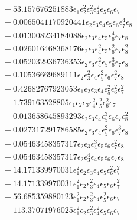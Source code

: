 \documentclass[10pt]{article}
\begin{document}
\begin{align*}
&{}  + 53.157676251883 \epsilon_{1} \epsilon_{2}^{2} \epsilon_{3}^{2} \epsilon_{4}^{2} \epsilon_{5} \epsilon_{6} \epsilon_{7} \\
&{}  + 0.0065041170920441 \epsilon_{2} \epsilon_{3} \epsilon_{4} \epsilon_{5} \epsilon_{6} \epsilon_{7}^{4} \epsilon_{8} \\
&{}  + 0.013008234184088 \epsilon_{2} \epsilon_{3} \epsilon_{4} \epsilon_{5} \epsilon_{6}^{4} \epsilon_{7} \epsilon_{8} \\
&{}  + 0.026016468368176 \epsilon_{2} \epsilon_{3} \epsilon_{4}^{2} \epsilon_{5} \epsilon_{6}^{2} \epsilon_{7} \epsilon_{8}^{2} \\
&{}  + 0.052032936736353 \epsilon_{2} \epsilon_{3} \epsilon_{4}^{2} \epsilon_{5} \epsilon_{6}^{3} \epsilon_{7} \epsilon_{8} \\
&{}  + 0.10536669689111 \epsilon_{2} \epsilon_{3}^{2} \epsilon_{4} \epsilon_{5}^{2} \epsilon_{6} \epsilon_{7}^{2} \epsilon_{8} \\
&{}  + 0.42682767923053 \epsilon_{1} \epsilon_{2} \epsilon_{3} \epsilon_{4} \epsilon_{5}^{2} \epsilon_{6}^{2} \epsilon_{7}^{2} \\
&{}  + 1.739163528805 \epsilon_{1} \epsilon_{2} \epsilon_{3} \epsilon_{4}^{2} \epsilon_{5}^{2} \epsilon_{6}^{2} \epsilon_{7} \\
&{}  + 0.013658645893293 \epsilon_{2} \epsilon_{3} \epsilon_{4} \epsilon_{5}^{3} \epsilon_{6} \epsilon_{7} \epsilon_{8}^{2} \\
&{}  + 0.027317291786585 \epsilon_{2} \epsilon_{3} \epsilon_{4} \epsilon_{5}^{2} \epsilon_{6} \epsilon_{7}^{3} \epsilon_{8} \\
&{}  + 0.05463458357317 \epsilon_{2} \epsilon_{3} \epsilon_{4}^{3} \epsilon_{5} \epsilon_{6} \epsilon_{7}^{2} \epsilon_{8} \\
&{}  + 0.05463458357317 \epsilon_{2} \epsilon_{3}^{4} \epsilon_{4} \epsilon_{5} \epsilon_{6} \epsilon_{7} \epsilon_{8} \\
&{}  + 14.171339970031 \epsilon_{1}^{2} \epsilon_{2} \epsilon_{3} \epsilon_{4} \epsilon_{5} \epsilon_{6}^{2} \epsilon_{7}^{2} \\
&{}  + 14.171339970031 \epsilon_{1}^{2} \epsilon_{2} \epsilon_{3}^{2} \epsilon_{4} \epsilon_{5} \epsilon_{6} \epsilon_{7}^{2} \\
&{}  + 56.685359880123 \epsilon_{1}^{2} \epsilon_{2} \epsilon_{3}^{2} \epsilon_{4} \epsilon_{5}^{2} \epsilon_{6} \epsilon_{7} \\
&{}  + 113.37071976025 \epsilon_{1}^{2} \epsilon_{2} \epsilon_{3}^{2} \epsilon_{4}^{2} \epsilon_{5} \epsilon_{6} \epsilon_{7} \\

\end{align*}
\end{document}
